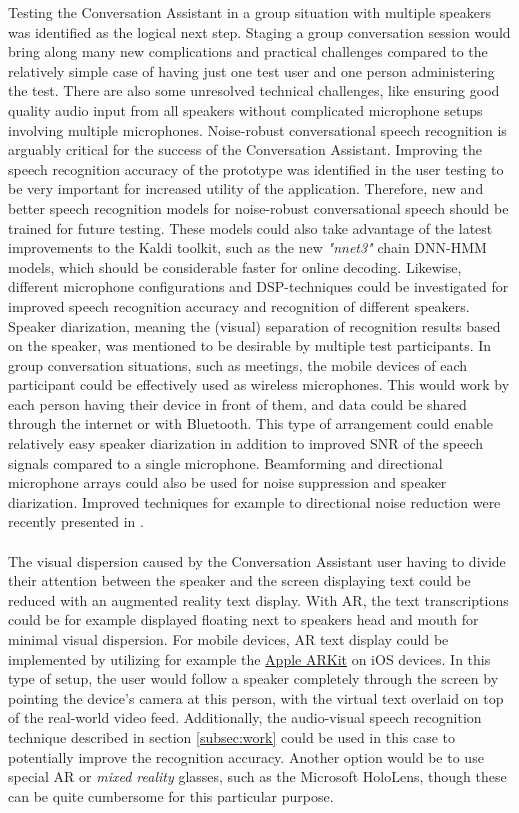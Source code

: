 \documentclass[english, 12pt, a4paper, pdftex, elec, utf8]{aaltothesis}
\begin{document}
Testing the Conversation Assistant in a group situation with multiple speakers was identified as the logical next step. Staging a group conversation session would bring along many new complications and practical challenges compared to the relatively simple case of having just one test user and one person administering the test. There are also some unresolved technical challenges, like ensuring good quality audio input from all speakers without complicated microphone setups involving multiple microphones. Noise-robust conversational speech recognition is arguably critical for the success of the Conversation Assistant. Improving the speech recognition accuracy of the prototype was identified in the user testing to be very important for increased utility of the application. Therefore, new and better speech recognition models for noise-robust conversational speech should be trained for future testing. These models could also take advantage of the latest improvements to the Kaldi toolkit, such as the new \textit{"nnet3"} chain DNN-HMM models, which should be considerable faster for online decoding. Likewise, different microphone configurations and DSP-techniques could be investigated for improved speech recognition accuracy and recognition of different speakers. Speaker diarization, meaning the (visual) separation of recognition results based on the speaker, was mentioned to be desirable by multiple test participants. In group conversation situations, such as meetings, the mobile devices of each participant could be effectively used as wireless microphones. This would work by each person having their device in front of them, and data could be shared through the internet or with Bluetooth. This type of arrangement could enable relatively easy speaker diarization in addition to improved SNR of the speech signals compared to a single microphone. Beamforming and directional microphone arrays could also be used for noise suppression and speaker diarization. Improved techniques for example to directional noise reduction were recently presented in \cite{delikaris2017parametric}. \\\\
The visual dispersion caused by the Conversation Assistant user having to divide their attention between the speaker and the screen displaying text could be reduced with an augmented reality text display. With AR, the text transcriptions could be for example displayed floating next to speakers head and mouth for minimal visual dispersion. For mobile devices, AR text display could be implemented by utilizing for example the \href{https://developer.apple.com/arkit/}{Apple ARKit} on iOS devices. In this type of setup, the user would follow a speaker completely through the screen by pointing the device's camera at this person, with the virtual text overlaid on top of the real-world video feed. Additionally, the audio-visual speech recognition technique described in section \ref{subsec:work} could be used in this case to potentially improve the recognition accuracy. Another option would be to use special AR or \textit{mixed reality} glasses, such as the Microsoft HoloLens, though these can be quite cumbersome for this particular purpose.
\end{document}
